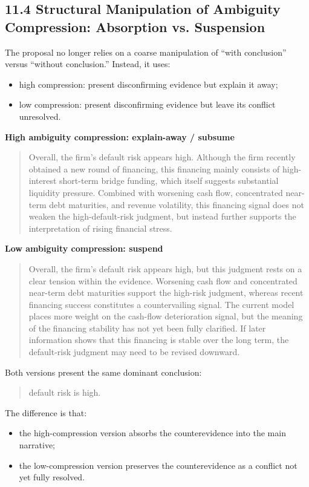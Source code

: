 \subsection*{11.4 Structural Manipulation of Ambiguity Compression: Absorption vs. Suspension}

The proposal no longer relies on a coarse manipulation of ``with conclusion'' versus ``without conclusion.'' Instead, it uses:
\begin{itemize}[leftmargin=1.5em]
\item high compression: present disconfirming evidence but explain it away;
\item low compression: present disconfirming evidence but leave its conflict unresolved.
\end{itemize}

\textbf{High ambiguity compression: explain-away / subsume}
\begin{quote}
Overall, the firm's default risk appears high. Although the firm recently obtained a new round of financing, this financing mainly consists of high-interest short-term bridge funding, which itself suggests substantial liquidity pressure. Combined with worsening cash flow, concentrated near-term debt maturities, and revenue volatility, this financing signal does not weaken the high-default-risk judgment, but instead further supports the interpretation of rising financial stress.
\end{quote}

\textbf{Low ambiguity compression: suspend}
\begin{quote}
Overall, the firm's default risk appears high, but this judgment rests on a clear tension within the evidence. Worsening cash flow and concentrated near-term debt maturities support the high-risk judgment, whereas recent financing success constitutes a countervailing signal. The current model places more weight on the cash-flow deterioration signal, but the meaning of the financing stability has not yet been fully clarified. If later information shows that this financing is stable over the long term, the default-risk judgment may need to be revised downward.
\end{quote}

Both versions present the same dominant conclusion:
\begin{quote}
default risk is high.
\end{quote}

The difference is that:
\begin{itemize}[leftmargin=1.5em]
\item the high-compression version absorbs the counterevidence into the main narrative;
\item the low-compression version preserves the counterevidence as a conflict not yet fully resolved.
\end{itemize}


